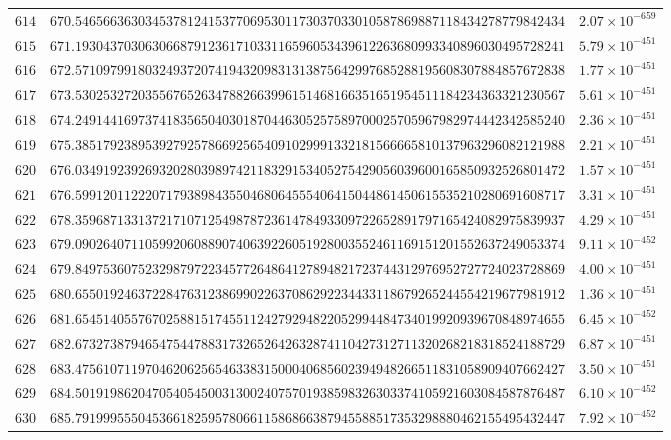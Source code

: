 \documentclass[12pt,reqno]{amsart}
\theoremstyle{remark}
\begin{document}
\begin{longtable}{clc}
$614$ & $670.5465663630345378124153770695301173037033010587869887118434278779842434$ & $2.07\times 10^{-659}$ \\
$615$ & $671.1930437030630668791236171033116596053439612263680993340896030495728241$ & $5.79\times 10^{-451}$ \\
$616$ & $672.5710979918032493720741943209831313875642997685288195608307884857672838$ & $1.77\times 10^{-451}$ \\
$617$ & $673.5302532720355676526347882663996151468166351651954511184234363321230567$ & $5.61\times 10^{-451}$ \\
$618$ & $674.2491441697374183565040301870446305257589700025705967982974442342585240$ & $2.36\times 10^{-451}$ \\
$619$ & $675.3851792389539279257866925654091029991332181566665810137963296082121988$ & $2.21\times 10^{-451}$ \\
$620$ & $676.0349192392693202803989742118329153405275429056039600165850932526801472$ & $1.57\times 10^{-451}$ \\
$621$ & $676.5991201122207179389843550468064555406415044861450615535210280691608717$ & $3.31\times 10^{-451}$ \\
$622$ & $678.3596871331372171071254987872361478493309722652891797165424082975839937$ & $4.29\times 10^{-451}$ \\
$623$ & $679.0902640711059920608890740639226051928003552461169151201552637249053374$ & $9.11\times 10^{-452}$ \\
$624$ & $679.8497536075232987972234577264864127894821723744312976952727724023728869$ & $4.00\times 10^{-451}$ \\
$625$ & $680.6550192463722847631238699022637086292234433118679265244554219677981912$ & $1.36\times 10^{-451}$ \\
$626$ & $681.6545140557670258815174551124279294822052994484734019920939670848974655$ & $6.45\times 10^{-452}$ \\
$627$ & $682.6732738794654754478831732652642632874110427312711320268218318524188729$ & $6.87\times 10^{-451}$ \\
$628$ & $683.4756107119704620625654633831500040685602394948266511831058909407662427$ & $3.50\times 10^{-451}$ \\
$629$ & $684.5019198620470540545003130024075701938598326303374105921603084587876487$ & $6.10\times 10^{-452}$ \\
$630$ & $685.7919995550453661825957806611586866387945588517353298880462155495432447$ & $7.92\times 10^{-452}$ \\

\end{longtable}
\end{document}
